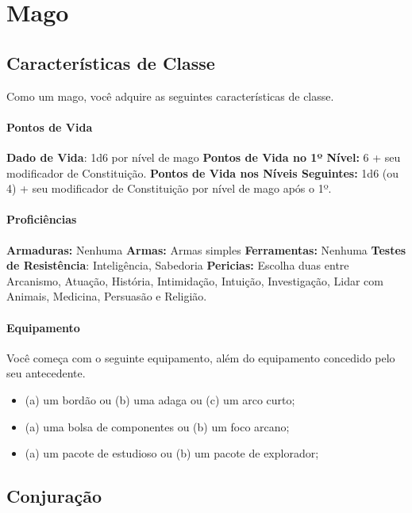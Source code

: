 \documentclass{RPG_Adventure}[2021/10/20]
\begin{document}
\chapter{Mago}%
\label{cha:mago}
\begin{multicols}{2}

\section*{Características de Classe}%

Como um mago, você adquire as seguintes características de classe.

\subsubsection{Pontos de Vida}%

\textbf{Dado de Vida}: 1d6 por nível de mago \nl
\textbf{Pontos de Vida no 1º Nível:} 6 + seu modificador de Constituição. \nl
\textbf{Pontos de Vida nos Níveis Seguintes:} 1d6 (ou 4) + seu modificador de
Constituição por nível de mago após o 1º.

\subsubsection{Proficiências}%

\textbf{Armaduras:} Nenhuma \nl
\textbf{Armas:} Armas simples \nl
\textbf{Ferramentas:} Nenhuma \jump
\textbf{Testes de Resistência}: Inteligência, Sabedoria \nl
\textbf{Pericias:} Escolha duas entre Arcanismo, Atuação, História, Intimidação,
Intuição, Investigação, Lidar com Animais, Medicina, Persuasão e Religião.

\subsubsection{Equipamento}%

Você começa com o seguinte equipamento, além do equipamento concedido pelo seu
antecedente.
\begin{itemize}
    \item (a) um bordão ou (b) uma adaga ou (c) um arco curto;
    \item (a) uma bolsa de componentes ou (b) um foco arcano;
    \item (a) um pacote de estudioso ou (b) um pacote de explorador;
\end{itemize}

\section*{Conjuração}%


\end{multicols}
\end{document}

